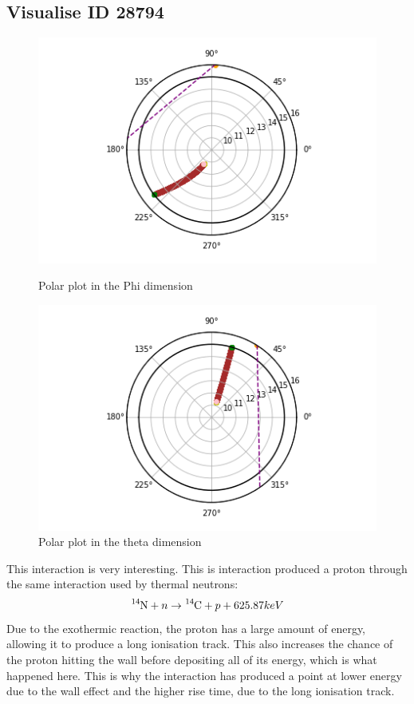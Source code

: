 \documentclass[a4paper]{article}
\begin{document}
\subsection{Visualise ID 28794}
\begin{figure}[H]
    \centering
    \begin{minipage}{.5\textwidth}
        \centering
        \includegraphics[width=1\linewidth]{Fast/28794_phi.png}
        \caption{Polar plot in the Phi dimension}
        \label{fig:prob1_6_2}
    \end{minipage}%
    \begin{minipage}{0.5\textwidth}
        \centering
        \includegraphics[width=1\linewidth]{Fast/28794_theta.png}
        \caption{Polar plot in the theta dimension}
        \label{fig:prob1_6_1}
    \end{minipage}
\end{figure}
\noindent This interaction is very interesting. This is interaction produced a proton through the same interaction used by thermal neutrons:
\begin{equation}
    \ce{^{14}N} + n \rightarrow \ce{^{14}C} + p + 625.87keV
    \label{eq:neu}
\end{equation}
\noindent Due to the exothermic reaction, the proton has a large amount of energy, allowing it to produce a long ionisation track. This also increases the chance of the proton hitting the wall before depositing all of its energy, which is what happened here. This is why the interaction has produced a point at lower energy due to the wall effect and the higher rise time, due to the long ionisation track.
\end{document}
